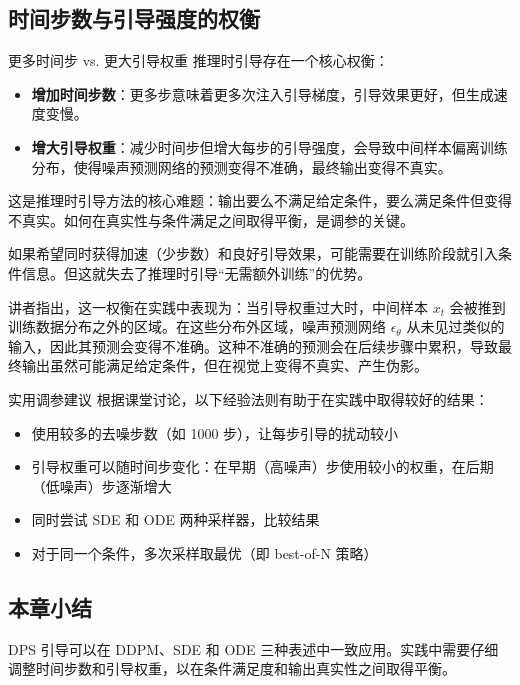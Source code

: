\documentclass[a4paper]{article}
\begin{document}
\subsection{时间步数与引导强度的权衡}

\begin{warningbox}{更多时间步 vs. 更大引导权重}
推理时引导存在一个核心权衡：
\begin{itemize}
    \item \textbf{增加时间步数}：更多步意味着更多次注入引导梯度，引导效果更好，但生成速度变慢。
    \item \textbf{增大引导权重}：减少时间步但增大每步的引导强度，会导致中间样本偏离训练分布，使得噪声预测网络的预测变得不准确，最终输出变得不真实。
\end{itemize}
这是推理时引导方法的核心难题：输出要么不满足给定条件，要么满足条件但变得不真实。如何在真实性与条件满足之间取得平衡，是调参的关键。
\end{warningbox}

如果希望同时获得加速（少步数）和良好引导效果，可能需要在训练阶段就引入条件信息。但这就失去了推理时引导``无需额外训练''的优势。

讲者指出，这一权衡在实践中表现为：当引导权重过大时，中间样本 $x_t$ 会被推到训练数据分布之外的区域。在这些分布外区域，噪声预测网络 $\epsilon_\theta$ 从未见过类似的输入，因此其预测会变得不准确。这种不准确的预测会在后续步骤中累积，导致最终输出虽然可能满足给定条件，但在视觉上变得不真实、产生伪影。

\begin{knowledgebox}{实用调参建议}
根据课堂讨论，以下经验法则有助于在实践中取得较好的结果：
\begin{itemize}
    \item 使用较多的去噪步数（如 1000 步），让每步引导的扰动较小
    \item 引导权重可以随时间步变化：在早期（高噪声）步使用较小的权重，在后期（低噪声）步逐渐增大
    \item 同时尝试 SDE 和 ODE 两种采样器，比较结果
    \item 对于同一个条件，多次采样取最优（即 best-of-N 策略）
\end{itemize}
\end{knowledgebox}

\subsection{本章小结}

DPS 引导可以在 DDPM、SDE 和 ODE 三种表述中一致应用。实践中需要仔细调整时间步数和引导权重，以在条件满足度和输出真实性之间取得平衡。
\end{document}
